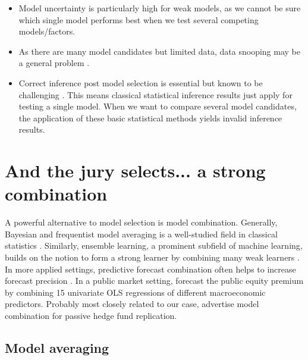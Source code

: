 \documentclass[12pt]{article}
\begin{document}
\begin{itemize}
	\item Model uncertainty is particularly high for weak models, as we cannot be sure which single model performs best when we test several competing models/factors.
	\item As there are many model candidates but limited data, data snooping may be a general problem \citep{W00}. 
	\item Correct inference post model selection is essential but known to be challenging \citep{BLP19}. This means classical statistical inference results just apply for testing a single model. When we want to compare several model candidates, the application of these basic statistical methods yields invalid inference results.
\end{itemize}



\section{And the jury selects... a strong combination}
\label{sec:model_combination}

A powerful alternative to model selection is model combination.
Generally, Bayesian and frequentist model averaging is a well-studied field in classical statistics \citep{H14,M15}.
Similarly, ensemble learning, a prominent subfield of machine learning, builds on the notion to form a strong learner by combining many weak learners \citep{B12}.
In more applied settings, predictive forecast combination often helps to increase forecast precision \citep{HL10}.
In a public market setting, \cite{RSZ10} forecast the public equity premium by combining 15 univariate OLS regressions of different macroeconomic predictors.
Probably most closely related to our case, \cite{OST17} advertise model combination for passive hedge fund replication.


\subsection{Model averaging}
\label{sec:model_averaging}
\end{document}
